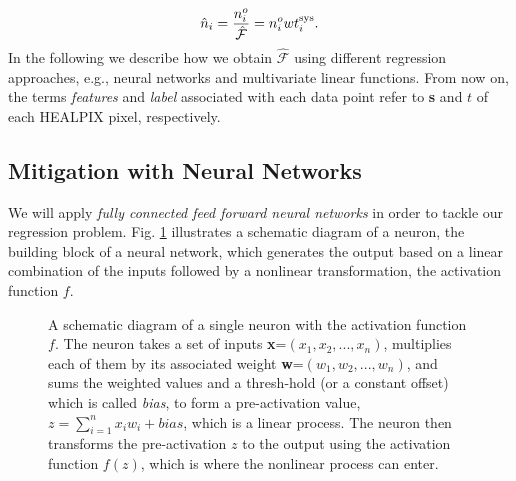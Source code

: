 \documentclass[fleqn, usenatbib]{mnras}
\begin{document}
\begin{align}\label{eq:wsys}
\hat{n}_i = \frac{n^o_i}{\hat{\mathcal{F}}}=n^o_i wt^{{\rm sys}}_{i}.
\end{align}
In the following we describe how we obtain $\hat{\mathcal{F}}$ using different regression approaches, e.g., neural networks and multivariate linear functions. From now on, the terms \textit{features} and \textit{label} associated with each data point refer to \textbf{s} and $t$ of each HEALPIX pixel, respectively. 

\subsection{Mitigation with Neural Networks}\label{subsec:MethodNN}
We will apply {\it fully connected feed forward neural networks} in order to tackle our regression problem. Fig. \ref{fig:perceptron} illustrates a schematic diagram of a neuron, the building block of a neural network, which generates the output based on a linear combination of the inputs followed by a nonlinear transformation, the activation function $f$.\\

\begin{figure}
\caption{A schematic diagram of a single neuron with the activation function $f$. The neuron takes a set of inputs \textbf{x}=$(x_{1}, x_{2},...,x_{n})$, multiplies each of them by its associated weight \textbf{w}=$(w_{1}, w_{2},...,w_{n})$, and sums the weighted values and a thresh-hold (or a constant offset) which is called \textit{bias}, to form a pre-activation value, $z=\sum_{i=1}^{n}x_{i}w_{i} + bias$, which is a linear process. The neuron then transforms the pre-activation $z$ to the output using the activation function $f(z)$, which is where the nonlinear process can enter. }\label{fig:perceptron}
\end{figure}
\end{document}
